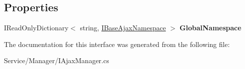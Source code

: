 \subsection*{Properties}
\begin{DoxyCompactItemize}
\item 
\hypertarget{interface_snowflake_1_1_service_1_1_manager_1_1_i_ajax_manager_ab615c30c63704deb66fcc9b22fe95a64}{}I\+Read\+Only\+Dictionary$<$ string, \hyperlink{interface_snowflake_1_1_ajax_1_1_i_base_ajax_namespace}{I\+Base\+Ajax\+Namespace} $>$ {\bfseries Global\+Namespace}\label{interface_snowflake_1_1_service_1_1_manager_1_1_i_ajax_manager_ab615c30c63704deb66fcc9b22fe95a64}

\end{DoxyCompactItemize}


The documentation for this interface was generated from the following file\+:\begin{DoxyCompactItemize}
\item 
Service/\+Manager/I\+Ajax\+Manager.\+cs\end{DoxyCompactItemize}
